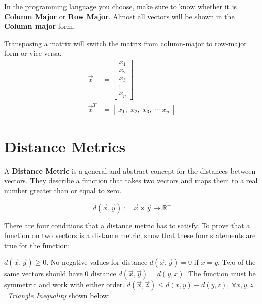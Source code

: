 In the programming language you choose, make sure to know whether it is \textbf{Column Major} or \textbf{Row Major}. Almost all vectors will be shown in the \textbf{Column major} form.


Transposing a matrix will switch the matrix from column-major to row-major form or vice versa.
  \begin{align*}
    \vec{x} &= \begin{bmatrix}
           x_{1} \\
           x_{2} \\
           x_{3} \\
           \vdots \\
           x_{p}
         \end{bmatrix} \\
    \vec{x}^T &= [\; x_1, \; x_2, \; x_3, \; \cdots \; x_p \;]
  \end{align*}



\section{Distance Metrics}
A \textbf{Distance Metric} is a general and abstract concept for the distances between vectors. They describe a function that takes two vectors and maps them to a real number greater than or equal to zero. 

\[
    d(\vec{x},\vec{y}):= \vec{x} \times \vec{y} \rightarrow \mathbb{R}^+
\]

There are four conditions that a distance metric has to satisfy. To prove that a function on two vectors is a distance metric, show that these four statements are true for the function:

\begin{outline}
    \1 $d(\vec{x}, \vec{y}) \ge 0$. \; No negative values for distance
    \1 $d(\vec{x}, \vec{y}) = 0$ if $x = y$. \; Two of the same vectors should have 0 distance
    \1 $d(\vec{x}, \vec{y}) = d(y,x)$. \; The function must be symmetric and work with either order.
    \1 $d(\vec{x}, \vec{z}) \le d(x,y) + d(y,z)$, $\forall x, y, z$ \  \textit{Triangle Inequality} shown below:
\end{outline}

\begin{center}
\end{center}

